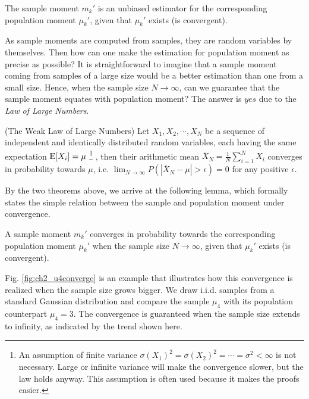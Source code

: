 \begin{thm}
The sample moment $ m_k' $ is an unbiased estimator for the corresponding population moment $ \mu_k' $, given that $ \mu_k' $ exists (is convergent).
\end{thm}

As sample moments are computed from samples, they are random variables by themselves. Then how can one make the estimation for population moment as precise as possible? It is straightforward to imagine that a sample moment  coming from samples of a large size would be a better estimation than one from a small size. Hence, when the sample size $ N \rightarrow \infty $, can we guarantee that the sample moment equates with population moment? The answer is $ yes $ due to the \textit{Law of Large Numbers}.

\begin{thm}
(The Weak Law of Large Numbers) Let $ X_1, X_2, \cdots, X_N $ be a sequence of independent and identically distributed random variables, each having the same expectation $ \E[X_i]=\mu $ \footnote{An assumption of finite variance $\sigma(X_1)^2 = \sigma(X_2)^2 = \cdots = \sigma^2 < \infty $ is not necessary. Large or infinite variance will make the convergence slower, but the law holds anyway. This assumption is often used because it makes the proofs easier.}
, then their arithmetic mean $ \overline{X}_N = \frac{1}{N} \sum_{i=1}^{N} X_i$ converges in probability towards $ \mu $, i.e. $\lim_{N \rightarrow \infty} P(|\overline{X}_N - \mu|>\epsilon) = 0$ for any positive $ \epsilon $. 
\end{thm}

By the two theorems above, we arrive at the following lemma, which formally states the simple relation between the sample and population moment under convergence. 
\begin{lemma}
A sample moment $ m_k' $ converges in probability towards the corresponding population moment $ \mu_k' $ when the sample size $ N \rightarrow \infty $, given that $ \mu_k' $ exists (is convergent).
\end{lemma}

Fig. \ref{fig:ch2_u4converge} is an example that illustrates how this convergence is realized when the sample size grows bigger. We draw i.i.d. samples from a standard Gaussian distribution and compare the sample $ \mu_4 $ with its population counterpart $ \mu_4=3 $. The convergence is guaranteed when the sample size extends to infinity, as indicated by the trend shown here. 


